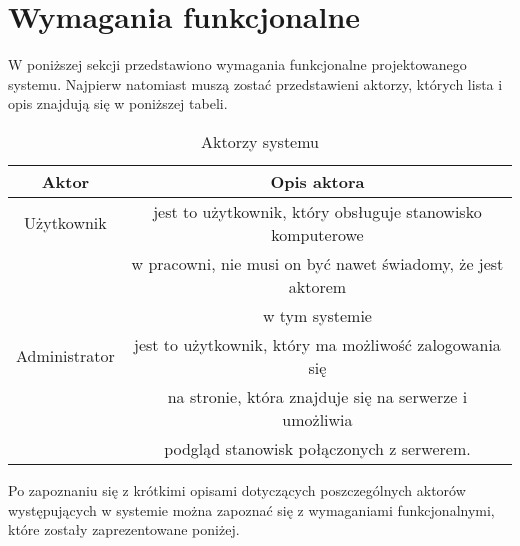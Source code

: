 \section {Wymagania funkcjonalne}
W poniższej sekcji przedstawiono wymagania funkcjonalne projektowanego systemu. Najpierw natomiast muszą zostać przedstawieni aktorzy, których lista i opis znajdują się w poniższej tabeli.


\begin{table}[!ht]
\caption{\label{tab:widgets}Aktorzy systemu}
\begin{tabular}{|c|c|} \hline
Aktor & Opis aktora \\ \hline
Użytkownik   & jest to użytkownik, który obsługuje stanowisko komputerowe\\
             & w pracowni, nie musi on być nawet świadomy, że jest aktorem\\
             & w tym systemie \\ \hline

Administrator   & jest to użytkownik, który ma możliwość zalogowania się \\
                & na stronie, która znajduje się na serwerze i umożliwia \\
                & podgląd stanowisk połączonych z serwerem. \\ \hline

\end{tabular}
\end{table}
\newline\newline\newline
Po zapoznaniu się z krótkimi opisami dotyczących poszczególnych aktorów występujących w systemie można zapoznać się z wymaganiami funkcjonalnymi, które zostały zaprezentowane poniżej.


